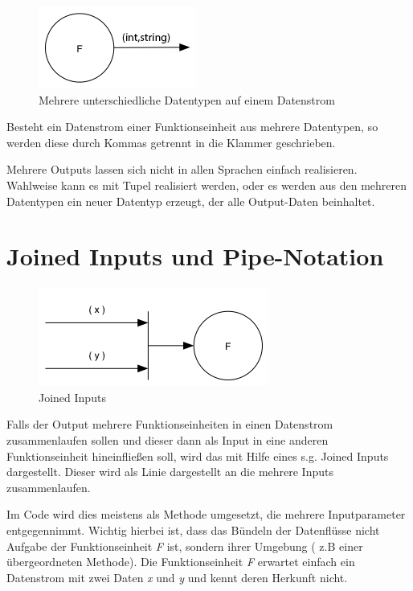 \begin{figure}[!htbp]
	\centering
	\includegraphics[width=.5\linewidth]{./img/diagramIntString.png}
	\caption{Mehrere unterschiedliche Datentypen auf einem Datenstrom}
\end{figure}


Besteht ein Datenstrom einer Funktionseinheit aus mehrere Datentypen, so werden diese durch Kommas getrennt in die Klammer geschrieben.

Mehrere Outputs lassen sich nicht in allen Sprachen einfach realisieren.
Wahlweise kann es mit Tupel realisiert werden, oder es werden aus den mehreren Datentypen ein 
neuer Datentyp erzeugt, der alle Output-Daten beinhaltet.

\section{Joined Inputs und Pipe-Notation}

\begin{figure}[!htbp]
	\centering
	\includegraphics[width=.7\linewidth]{./img/diagramJoin.png}
	\caption{Joined Inputs}
\end{figure}


Falls der Output mehrere Funktionseinheiten in einen Datenstrom zusammenlaufen
sollen und dieser dann als Input in eine anderen Funktionseinheit hineinfließen
soll, wird das mit Hilfe eines s.g. Joined Inputs dargestellt. 
Dieser wird als Linie dargestellt an die mehrere Inputs zusammenlaufen.

Im Code wird dies meistens als Methode umgesetzt, die mehrere Inputparameter entgegennimmt.
Wichtig hierbei ist, dass das Bündeln der Datenflüsse nicht Aufgabe der
Funktionseinheit \textit{F} ist, sondern ihrer Umgebung ( z.B einer übergeordneten Methode).
Die Funktionseinheit \textit{F} erwartet einfach ein Datenstrom mit zwei Daten \textit{x} und \textit{y}
und kennt deren Herkunft nicht.

